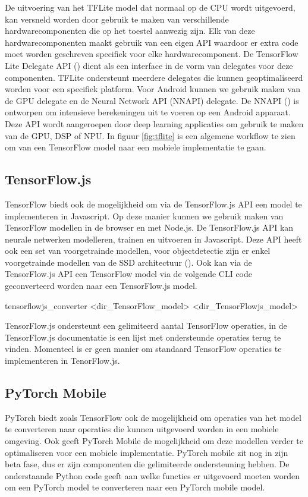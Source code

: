 De uitvoering van het TFLite model dat normaal op de CPU wordt uitgevoerd, kan versneld worden door gebruik te maken van verschillende hardwarecomponenten die op het toestel aanwezig zijn.
Elk van deze hardwarecomponenten maakt gebruik van een eigen API waardoor er extra code moet worden geschreven specifiek voor elke hardwarecomponent.
De TensorFlow Lite Delegate API (\cite{tensorflow2015-whitepaper}) dient als een interface in de vorm van delegates voor deze componenten.
TFLite ondersteunt meerdere delegates die kunnen geoptimaliseerd worden voor een specifiek platform.
Voor Android kunnen we gebruik maken van de GPU delegate en de Neural Network API (NNAPI) delegate.
De NNAPI (\cite{Android_NNAPI_2021}) is ontworpen om intensieve berekeningen uit te voeren op een Android apparaat.
Deze API wordt aangeroepen door deep learning applicaties om gebruik te maken van de GPU, DSP of NPU.
In figuur \ref{fig:tflite} is een algemene workflow te zien om van een TensorFlow model naar een mobiele implementatie te gaan.

\subsection{TensorFlow.js}
TensorFlow biedt ook de mogelijkheid om via de TensorFlow.js API een model te implementeren in Javascript.
Op deze manier kunnen we gebruik maken van TensorFlow modellen in de browser en met Node.js.
De TensorFlow.js API kan neurale netwerken modelleren, trainen en uitvoeren in Javascript.
Deze API heeft ook een set van voorgetrainde modellen, voor objectdetectie zijn er enkel voorgetrainde modellen van de SSD architectuur (\cite{liu_ssd_2016}).
Ook kan via de TensorFlow.js API een TensorFlow model via de volgende CLI code geconverteerd worden naar een TensorFlow.js model.

\begin{python}
tensorflowjs_converter <dir_TensorFlow_model> <dir_TensorFlowjs_model>
\end{python}

TensorFlow.js ondersteunt een gelimiteerd aantal TensorFlow operaties, in de TensorFlow.js documentatie is een lijst met ondersteunde operaties terug te vinden.
Momenteel is er geen manier om standaard TensorFlow operaties te implementeren in TenorFlow.js.

\subsection{PyTorch Mobile} \label{trace}
PyTorch biedt zoals TensorFlow ook de mogelijkheid om operaties van het model te converteren naar operaties die kunnen uitgevoerd worden in een mobiele omgeving.
Ook geeft PyTorch Mobile de mogelijkheid om deze modellen verder te optimaliseren voor een mobiele implementatie.
PyTorch mobile zit nog in zijn beta fase, dus er zijn componenten die gelimiteerde ondersteuning hebben.
De onderstaande Python code geeft aan welke functies er uitgevoerd moeten worden om een PyTorch model te converteren naar een PyTorch mobile model.

